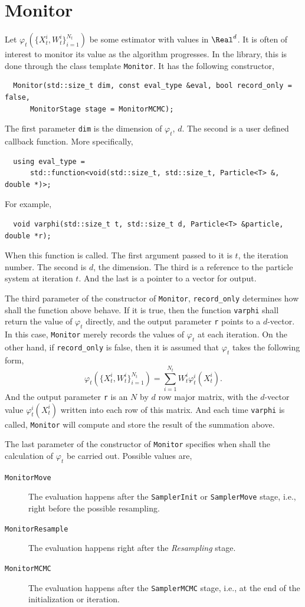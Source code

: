 \section{Monitor}
\label{sec:Monitor}

Let $\varphi_t(\{X_t^i,W_t^i\}_{i=1}^{N_t})$ be some estimator with values in
$\Real^d$. It is often of interest to monitor its value as the algorithm
progresses. In the library, this is done through the class template
\verb|Monitor|. It has the following constructor,
\begin{Verbatim}
  Monitor(std::size_t dim, const eval_type &eval, bool record_only = false,
      MonitorStage stage = MonitorMCMC);
\end{Verbatim}
The first parameter \verb|dim| is the dimension of $\varphi_t$, $d$. The second
is a user defined callback function. More specifically,
\begin{Verbatim}
  using eval_type =
      std::function<void(std::size_t, std::size_t, Particle<T> &, double *)>;
\end{Verbatim}
For example,
\begin{Verbatim}
  void varphi(std::size_t t, std::size_t d, Particle<T> &particle, double *r);
\end{Verbatim}
When this function is called. The first argument passed to it is $t$, the
iteration number. The second is $d$, the dimension. The third is a reference to
the particle system at iteration $t$. And the last is a pointer to a vector for
output.

The third parameter of the constructor of \verb|Monitor|, \verb|record_only|
determines how shall the function above behave. If it is true, then the
function \verb|varphi| shall return the value of $\varphi_t$ directly, and the
output parameter \verb|r| points to a $d$-vector. In this case, \verb|Monitor|
merely records the values of $\varphi_t$ at each iteration. On the other hand,
if \verb|record_only| is false, then it is assumed that $\varphi_t$ takes the
following form,
\begin{equation*}
  \varphi_t(\{X_t^i,W_t^i\}_{i=1}^{N_t}) =
  \sum_{i=1}^{N_t} W_t^i \varphi_t^i(X_t^i).
\end{equation*}
And the output parameter \verb|r| is an $N$ by $d$ row major matrix, with the
$d$-vector value $\varphi_t^i(X_t^i)$ written into each row of this matrix. And
each time \verb|varphi| is called, \verb|Monitor| will compute and store the
result of the summation above.

The last parameter of the constructor of \verb|Monitor| specifies when shall
the calculation of $\varphi_t$ be carried out. Possible values are,
\begin{description}
  \item[\texttt{MonitorMove}] The evaluation happens after the
    \verb|SamplerInit| or \verb|SamplerMove| stage, i.e., right before the
    possible resampling.
  \item[\texttt{MonitorResample}] The evaluation happens right after the
    \emph{Resampling} stage.
  \item[\texttt{MonitorMCMC}] The evaluation happens after the
    \verb|SamplerMCMC| stage, i.e., at the end of the initialization or
    iteration.
\end{description}

